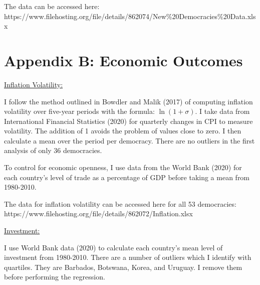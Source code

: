 \documentclass[11pt, oneside]{article}   	%
\begin{document}
\begin{flushleft}
The data can be accessed here:
https://www.filehosting.org/file/details/862074/New\%20Democracies\%20Data.xlsx 
\end{flushleft}

\newpage

\section*{Appendix B: Economic Outcomes}
\underline{Inflation Volatility:} 

\begin{flushleft}
I follow the method outlined in Bowdler and Malik (2017) of computing inflation volatility over five-year periods with the formula: \begin{math} \ln⁡(1+\sigma) \end{math}. I take data from International Financial Statistics (2020) for quarterly changes in CPI to measure volatility. The addition of 1 avoids the problem of values close to zero. I then calculate a mean over the period per democracy. There are no outliers in the first analysis of only 36 democracies. \\
\end{flushleft}

\begin{flushleft}
To control for economic openness, I use data from the World Bank (2020) for each country’s level of trade as a percentage of GDP before taking a mean from 1980-2010. \\
\end{flushleft}

\begin{flushleft}
The data for inflation volatility can be accessed here for all 53 democracies:\\
 https://www.filehosting.org/file/details/862072/Inflation.xlsx  \\
 \end{flushleft}
 
 \begin{flushleft}
 \underline{Investment:} \\
 \end{flushleft}
 \begin{flushleft}

 I use World Bank data (2020) to calculate each country’s mean level of investment from 1980-2010. There are a number of outliers which I identify with quartiles. They are Barbados, Botswana, Korea, and Uruguay. I remove them before performing the regression.
 
 \end{flushleft}
 
\end{document}
